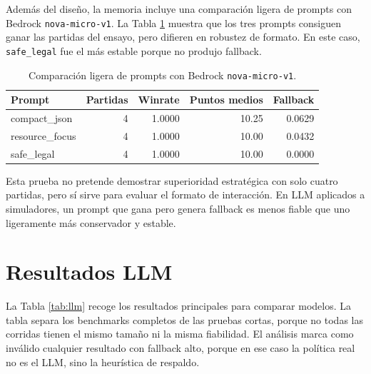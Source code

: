 ﻿\documentclass[10pt,a4paper]{article}
\begin{document}
Además del diseño, la memoria incluye una comparación ligera de prompts con Bedrock \texttt{nova-micro-v1}. La Tabla \ref{tab:prompts} muestra que los tres prompts consiguen ganar las partidas del ensayo, pero difieren en robustez de formato. En este caso, \texttt{safe\_legal} fue el más estable porque no produjo fallback.

\begin{table}[H]
\centering
\small
\begin{tabular}{lrrrr}
\toprule
Prompt & Partidas & Winrate & Puntos medios & Fallback \\
\midrule
compact\_json & 4 & 1.0000 & 10.25 & 0.0629 \\
resource\_focus & 4 & 1.0000 & 10.00 & 0.0432 \\
safe\_legal & 4 & 1.0000 & 10.00 & 0.0000 \\
\bottomrule
\end{tabular}
\caption{Comparación ligera de prompts con Bedrock \texttt{nova-micro-v1}.}
\label{tab:prompts}
\end{table}

Esta prueba no pretende demostrar superioridad estratégica con solo cuatro partidas, pero sí sirve para evaluar el formato de interacción. En LLM aplicados a simuladores, un prompt que gana pero genera fallback es menos fiable que uno ligeramente más conservador y estable.

\section{Resultados LLM}
La Tabla \ref{tab:llm} recoge los resultados principales para comparar modelos. La tabla separa los benchmarks completos de las pruebas cortas, porque no todas las corridas tienen el mismo tamaño ni la misma fiabilidad. El análisis marca como inválido cualquier resultado con fallback alto, porque en ese caso la política real no es el LLM, sino la heurística de respaldo.
\end{document}

